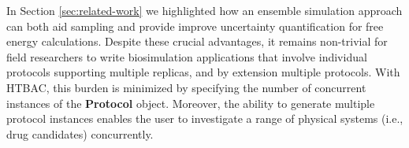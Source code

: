 	In Section \ref{sec:related-work} we highlighted how an ensemble
simulation approach can both aid sampling and provide improve uncertainty
quantification for free energy calculations. Despite these crucial advantages,
it remains non-trivial for field researchers to write biosimulation
applications that involve individual protocols supporting multiple replicas,
and by extension multiple protocols. With HTBAC, this burden is minimized by
specifying the number of concurrent instances of the \textbf{Protocol} object.
Moreover, the ability to generate multiple protocol instances enables the user
to investigate a range of physical systems (i.e., drug candidates)
concurrently.









